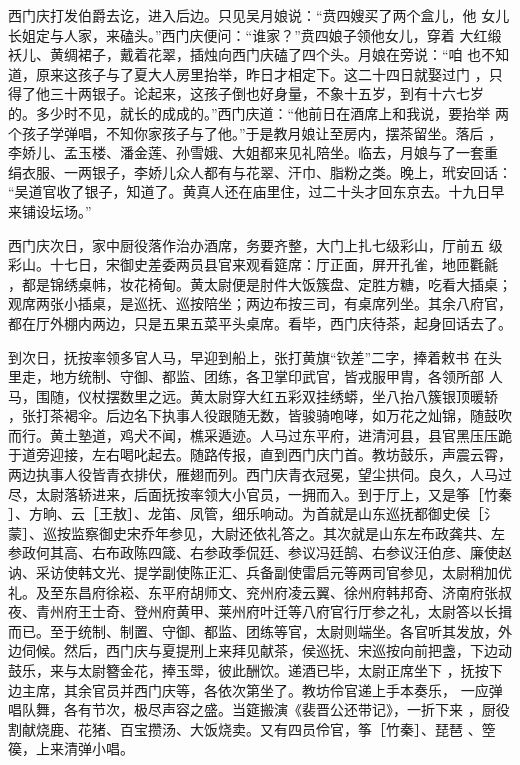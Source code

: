西门庆打发伯爵去讫，进入后边。只见吴月娘说：“贲四嫂买了两个盒儿，他
女儿长姐定与人家，来磕头。”西门庆便问：“谁家？”贲四娘子领他女儿，穿着
大红缎袄儿、黄绸裙子，戴着花翠，插烛向西门庆磕了四个头。月娘在旁说：“咱
也不知道，原来这孩子与了夏大人房里抬举，昨日才相定下。这二十四日就娶过门
，只得了他三十两银子。论起来，这孩子倒也好身量，不象十五岁，到有十六七岁
的。多少时不见，就长的成成的。”西门庆道：“他前日在酒席上和我说，要抬举
两个孩子学弹唱，不知你家孩子与了他。”于是教月娘让至房内，摆茶留坐。落后
，李娇儿、孟玉楼、潘金莲、孙雪娥、大姐都来见礼陪坐。临去，月娘与了一套重
绢衣服、一两银子，李娇儿众人都有与花翠、汗巾、脂粉之类。晚上，玳安回话：
“吴道官收了银子，知道了。黄真人还在庙里住，过二十头才回东京去。十九日早
来铺设坛场。”

西门庆次日，家中厨役落作治办酒席，务要齐整，大门上扎七级彩山，厅前五
级彩山。十七日，宋御史差委两员县官来观看筵席：厅正面，屏开孔雀，地匝氍毹
，都是锦绣桌帏，妆花椅甸。黄太尉便是肘件大饭簇盘、定胜方糖，吃看大插桌；
观席两张小插桌，是巡抚、巡按陪坐；两边布按三司，有桌席列坐。其余八府官，
都在厅外棚内两边，只是五果五菜平头桌席。看毕，西门庆待茶，起身回话去了。

到次日，抚按率领多官人马，早迎到船上，张打黄旗“钦差”二字，捧着敕书
在头里走，地方统制、守御、都监、团练，各卫掌印武官，皆戎服甲胄，各领所部
人马，围随，仪杖摆数里之远。黄太尉穿大红五彩双挂绣蟒，坐八抬八簇银顶暖轿
，张打茶褐伞。后边名下执事人役跟随无数，皆骏骑咆哮，如万花之灿锦，随鼓吹
而行。黄土塾道，鸡犬不闻，樵采遁迹。人马过东平府，进清河县，县官黑压压跪
于道旁迎接，左右喝叱起去。随路传报，直到西门庆门首。教坊鼓乐，声震云霄，
两边执事人役皆青衣排伏，雁翅而列。西门庆青衣冠冕，望尘拱伺。良久，人马过
尽，太尉落轿进来，后面抚按率领大小官员，一拥而入。到于厅上，又是筝［竹秦
］、方晌、云［王敖］、龙笛、凤管，细乐响动。为首就是山东巡抚都御史侯［氵
蒙］、巡按监察御史宋乔年参见，大尉还依礼答之。其次就是山东左布政龚共、左
参政何其高、右布政陈四箴、右参政季侃廷、参议冯廷鹄、右参议汪伯彦、廉使赵
讷、采访使韩文光、提学副使陈正汇、兵备副使雷启元等两司官参见，太尉稍加优
礼。及至东昌府徐崧、东平府胡师文、兖州府凌云翼、徐州府韩邦奇、济南府张叔
夜、青州府王士奇、登州府黄甲、莱州府叶迁等八府官行厅参之礼，太尉答以长揖
而已。至于统制、制置、守御、都监、团练等官，太尉则端坐。各官听其发放，外
边伺候。然后，西门庆与夏提刑上来拜见献茶，侯巡抚、宋巡按向前把盏，下边动
鼓乐，来与太尉簪金花，捧玉斝，彼此酬饮。递酒已毕，太尉正席坐下
，抚按下边主席，其余官员并西门庆等，各依次第坐了。教坊伶官递上手本奏乐，
一应弹唱队舞，各有节次，极尽声容之盛。当筵搬演《裴晋公还带记》，一折下来
，厨役割献烧鹿、花猪、百宝攒汤、大饭烧卖。又有四员伶官，筝［竹秦］、琵琶
、箜篌，上来清弹小唱。

